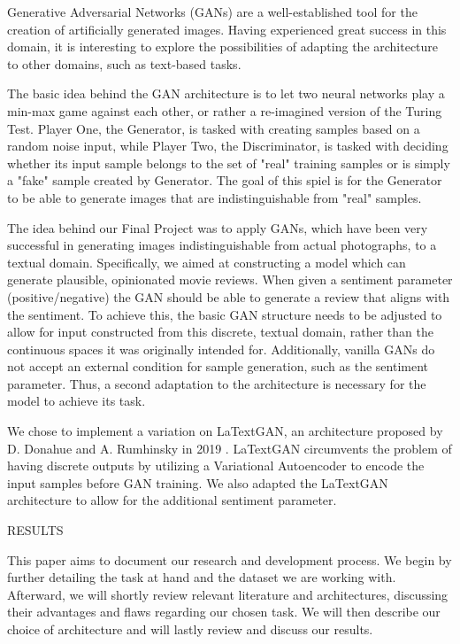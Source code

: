 \documentclass[../main]{subfiles}
\begin{document}
Generative Adversarial Networks (GANs) are a well-established tool for the creation of artificially generated images.  Having experienced great success in this domain, it is interesting to explore the possibilities of adapting the architecture to other domains, such as text-based tasks. 

The basic idea behind the GAN architecture is to let two neural networks play a min-max game against each other,  or rather a re-imagined version of the Turing Test.  Player One, the Generator, is tasked with creating samples based on a random noise input, while Player Two, the Discriminator,  is tasked with deciding whether its input sample belongs to the set of "real" training samples or is simply a "fake" sample created by Generator.  The goal of this spiel is for the Generator to be able to generate images that are indistinguishable from "real" samples.  

The idea behind our Final Project was to apply GANs, which have been very successful in generating images indistinguishable from actual photographs, to a textual domain. Specifically, we aimed at constructing a model which can generate plausible, opinionated movie reviews.  When given a sentiment parameter (positive/negative) the GAN should be able to generate a review that aligns with the sentiment. To achieve this, the basic GAN structure needs to be adjusted to allow for input constructed from this discrete, textual domain, rather than the continuous spaces it was originally intended for. Additionally, vanilla GANs do not accept an external condition for sample generation, such as the sentiment parameter. Thus,  a second adaptation to the architecture is necessary for the model to achieve its task.

We chose to implement a variation on LaTextGAN, an architecture proposed by D. Donahue and A. Rumhinsky in 2019 \cite{latextgan}. LaTextGAN circumvents the problem of having discrete outputs by utilizing a Variational Autoencoder to encode the input samples before GAN training. We also adapted the LaTextGAN architecture to allow for the additional sentiment parameter.

RESULTS

This paper aims to document our research and development process.  We begin by further detailing the task at hand and the dataset we are working with. Afterward, we will shortly review relevant literature and architectures,  discussing their advantages and flaws regarding our chosen task.  We will then describe our choice of architecture and will lastly review and discuss our results.
\end{document}
